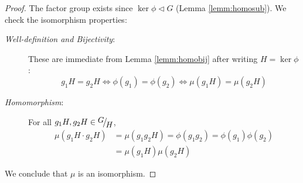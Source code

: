 \begin{proof}
	The factor group exists since $\ker\phi\triangleleft G$ (Lemma \ref{lemm:homosub}). We check the isomorphism properties:
  \begin{description}
		\item[\normalfont\emph{Well-definition and Bijectivity}:] These are immediate from Lemma \ref{lemm:homobij} after writing $H=\ker\phi$:
		\[
			g_1H=g_2H
			\iff \phi(g_1)=\phi(g_2)
			\iff \mu(g_1H)=\mu(g_2H)
		\]
		\item[\normalfont\emph{Homomorphism}:] For all $g_1H,g_2H\in\quotient GH$,
		\begin{align*}
			\mu(g_1H\cdot g_2H)
			&=\mu(g_1g_2H)=\phi(g_1g_2) 
				=\phi(g_1)\phi(g_2)
				\tag{$\phi$ is a homomorphism}\\
			&=\mu(g_1H)\mu(g_2H)
		\end{align*}
  \end{description}
	We conclude that $\mu$ is an isomorphism.
\end{proof}


